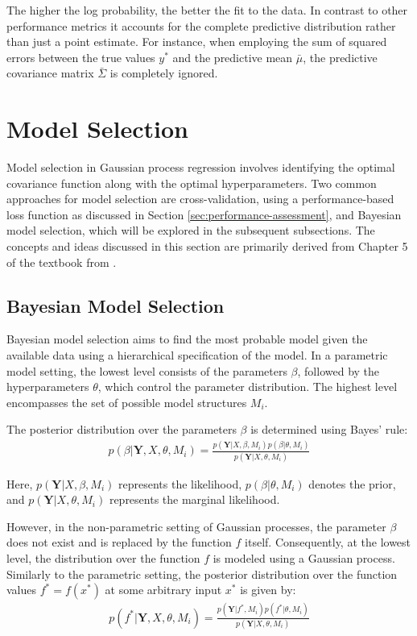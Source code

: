 The higher the log probability, the better the fit to the data.
In contrast to other performance metrics it accounts for the complete predictive
distribution rather than just a point estimate.
For instance, when employing the sum of squared errors between the true values $y^{\ast}$ and the predictive mean
$\bar{\mu}$, the predictive covariance matrix $\bar{\Sigma}$ is completely ignored.

\section{Model Selection}

Model selection in Gaussian process regression involves identifying the optimal covariance function
along with the optimal hyperparameters.
Two common approaches for model selection are cross-validation, using a performance-based loss
function as discussed in Section \ref{sec:performance-assessment}, and Bayesian model selection,
which will be explored in the subsequent subsections.
The concepts and ideas discussed in this section are primarily derived from Chapter 5 of
the textbook from \citeauthor{rasmussen_gaussian_2006}.

\subsection{Bayesian Model Selection}

Bayesian model selection aims to find the most probable model given the available data
using a hierarchical specification of the model.
In a parametric model setting, the lowest level consists of the parameters $\beta$,
followed by the hyperparameters $\theta$, which control the parameter distribution.
The highest level encompasses the set of possible model structures $M_i$.

The posterior distribution over the parameters $\beta$ is determined using Bayes' rule:
\begin{gather*}
    p(\beta | \mathbf{Y}, X, \theta, M_i) = \frac{p( \mathbf{Y}| X, \beta,
        M_i)p(\beta|\theta, M_i)}{p(\mathbf{Y}|X, \theta, M_i)}
\end{gather*}

Here, $p(\mathbf{Y} | X, \beta, M_i)$ represents the likelihood, $p(\beta | \theta, M_i)$ denotes the prior,
and $p(\mathbf{Y} | X, \theta, M_i)$ represents the marginal likelihood.


However, in the non-parametric setting of Gaussian processes, the parameter $\beta$ does not exist and is
replaced by the function $f$ itself.
Consequently, at the lowest level, the distribution over the function $f$ is modeled using a Gaussian process.
Similarly to the parametric setting, the posterior distribution over the function values
$f^{\ast} = f(x^{\ast})$ at some arbitrary input $x^{\ast}$ is given by:
\begin{gather*}
    p(f^{\ast} | \mathbf{Y}, X, \theta, M_i) = \frac{p( \mathbf{Y}| f^{\ast}, M_i)p(f^{\ast} | \theta, M_i)}{p(\mathbf{Y}|X, \theta, M_i)}
\end{gather*}

